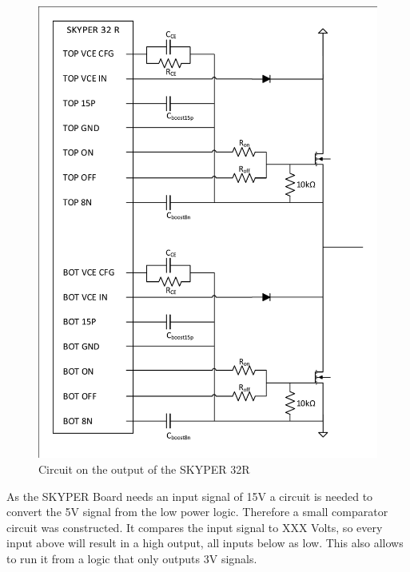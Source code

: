 \begin{figure}[H]
   \centering
   \includegraphics[width=\textwidth]{figures/Skyperboard/Skyper32out.pdf}
    \caption{Circuit on the output of the SKYPER 32R}
	\label{fig:ConventionalBoostONN}
\end{figure}

As the SKYPER Board needs an input signal of 15V a circuit is needed to convert the 5V signal from the low power logic.
Therefore a small comparator circuit was constructed.
It compares the input signal to XXX Volts, so every input above will result in a high output,
all inputs below as low.
This also allows to run it from a logic that only outputs 3V signals.